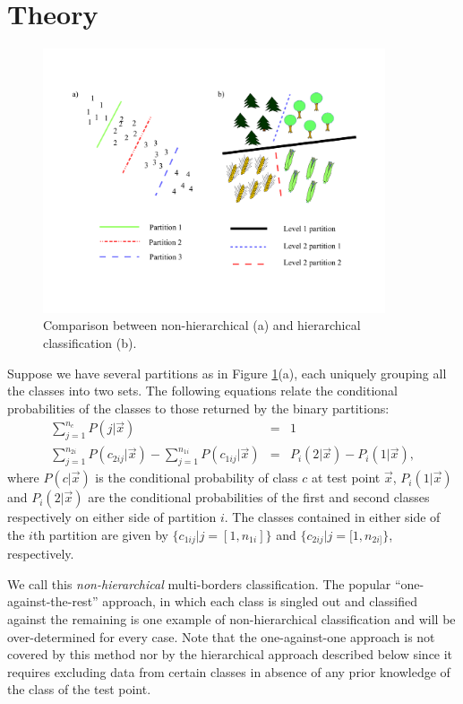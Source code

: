 \section{Theory}

\begin{figure}
\begin{center}
\includegraphics[width=0.9\textwidth]{multiclass_figure}
\end{center}
\caption{Comparison between non-hierarchical (a)
and hierarchical classification (b).}
\label{figure}
\end{figure}

Suppose we have several partitions as in Figure \ref{figure}(a), each uniquely grouping
all the classes into two sets.
The following equations relate the conditional probabilities
of the classes to those returned by the binary partitions:
\begin{eqnarray*}
\sum_{j=1}^{n_c} P(j|\vec x) & = & 1\\
\sum_{j=1}^{n_{2i}} P(c_{2ij} | \vec x) - 
\sum_{j=1}^{n_{1i}} P(c_{1ij} | \vec x) & = & P_i(2 | \vec x) - P_i(1 | \vec x),
\end{eqnarray*}
where $P(c|\vec x)$ is the conditional probability of class $c$ at test point $\vec x$,
$P_i(1|\vec x)$ and $P_i(2|\vec x)$ are the conditional probabilities of the first and second
classes respectively on either side of partition $i$.  The classes contained
in either side of the $i$th partition are given by $\lbrace c_{1ij}|j=[1, n_{1i}]\rbrace$ and 
$\lbrace c_{2ij}|j=[1, n_{2i]}\rbrace$, respectively.

We call this {\it non-hierarchical} multi-borders classification.  
The popular ``one-against-the-rest'' approach, 
in which each class is singled out and classified against the remaining 
is one example of non-hierarchical classification 
and will be over-determined for every case.  
Note that the one-against-one approach is not covered by this
method nor by the hierarchical approach described below since it requires
excluding data from certain classes in absence of any prior knowledge of the 
class of the test point.

